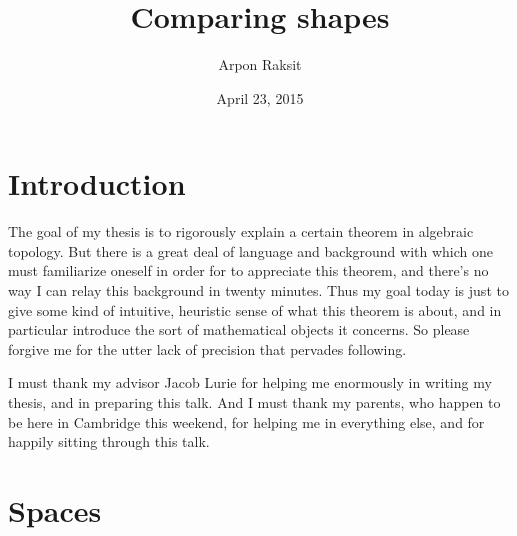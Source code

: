 

\title{Comparing shapes}
\author{Arpon Raksit}
\date{April 23, 2015}


\maketitle


\section{Introduction}

\begin{nothing}[Abstract]
  The goal of my thesis is to rigorously explain a certain theorem in
  algebraic topology. But there is a great deal of language and
  background with which one must familiarize oneself in order for to
  appreciate this theorem, and there's no way I can relay this
  background in twenty minutes. Thus my goal today is just to give
  some kind of intuitive, heuristic sense of what this theorem is
  about, and in particular introduce the sort of mathematical objects
  it concerns. So please forgive me for the utter lack of precision
  that pervades following.
\end{nothing}

\begin{nothing}[Acknowledgements]
  I must thank my advisor Jacob Lurie for helping me enormously in
  writing my thesis, and in preparing this talk. And I must thank my
  parents, who happen to be here in Cambridge this weekend, for
  helping me in everything else, and for happily sitting through this
  talk.
\end{nothing}


\section{Spaces}

